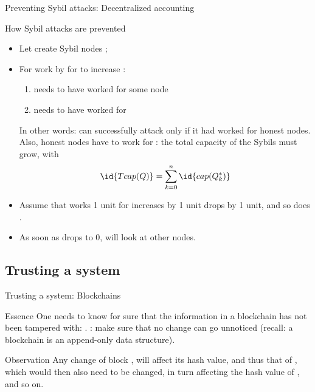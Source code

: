 \begin{slide}{Preventing Sybil attacks: Decentralized accounting}
  \begin{exampleblock}{How Sybil attacks are prevented}
    \begin{itemize}
    \item Let  create  Sybil nodes ; 
    \item For work by  for  to increase :
      \begin{enumerate}
      \item {} needs to have worked for some node 
      \item {} needs to have worked for 
      \end{enumerate}
      In other words:  can successfully attack only if it had worked for honest nodes. Also, honest
      nodes have to work for : the total capacity  of the Sybils must grow, with
      \[
      \id{Tcap(Q)} = \sum_{k=0}^n \id{cap(Q^*_k)} 
      \]
    \item Assume that  works 1 unit for  
      increases by 1 unit \mathexpr{\Rightarrow}  drops by 1 unit, and so does
      .
    \item As soon as  drops to 0,  will look at other nodes.
    \end{itemize}
  \end{exampleblock}
\end{slide}
\subsection{Trusting a system}
\begin{slide}{Trusting a system: Blockchains}
  \begin{block}{Essence}
    One needs to know for sure that the information in a blockchain has not been tampered with: . : make sure that no change can go unnoticed (recall: a blockchain
    is an append-only data structure).
  \end{block}
  \begin{centerfig}
  \end{centerfig}
  \begin{alertblock}{Observation}
    Any change of block , will affect its hash value, and thus that of , which would then
    also need to be changed, in turn affecting the hash value of , and so on.
  \end{alertblock}
\end{slide}
